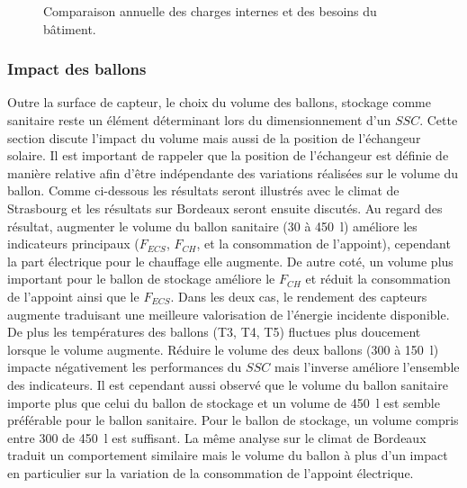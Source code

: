 \begin{figure}
    \begin{center}
    \end{center}
    \caption{Comparaison annuelle des charges internes et des besoins du bâtiment.
             \label{fig:comp_charge_besoins}}
\end{figure}



\subsubsection{Impact des ballons} %
\label{ssub:impact_des_ballons}
Outre la surface de capteur, le choix du volume des ballons, stockage comme sanitaire
reste un élément déterminant lors du dimensionnement d’un $SSC$. Cette section discute
l’impact du volume mais aussi de la position de l’échangeur solaire. Il est important de
rappeler que la position de l’échangeur est définie de manière relative afin d’être
indépendante des variations réalisées sur le volume du ballon.
Comme ci-dessous les résultats seront illustrés avec le climat de Strasbourg et
les résultats sur Bordeaux seront ensuite discutés.
Au regard des résultat, augmenter le volume du ballon
sanitaire (\num{30} à \SI{450}{\litre}) améliore les indicateurs principaux ($F_{ECS}$, $F_{CH}$, et la consommation
de l’appoint), cependant la part électrique pour le chauffage elle augmente.
De autre coté, un volume plus important pour le ballon de stockage améliore le $F_{CH}$
et réduit la consommation de l’appoint ainsi que le $F_{ECS}$. Dans les deux cas, le
rendement des capteurs augmente traduisant une meilleure valorisation de l’énergie incidente
disponible. De plus les températures des ballons (T3, T4, T5) fluctues plus doucement
lorsque le volume augmente.
Réduire le volume des deux ballons (\num{300} à \SI{150}{\litre}) impacte négativement
les performances du $SSC$ mais l’inverse améliore l’ensemble des indicateurs.
Il est cependant aussi observé que le volume du ballon sanitaire importe plus que
celui du ballon de stockage et un volume de \SI{450}{\litre} est semble préférable
pour le ballon sanitaire. Pour le ballon de stockage, un volume compris entre \num{300}
de \SI{450}{\litre} est suffisant.
La même analyse sur le climat de Bordeaux traduit un comportement similaire mais
le volume du ballon à plus d’un impact en particulier sur la variation de la consommation
de l’appoint électrique.

